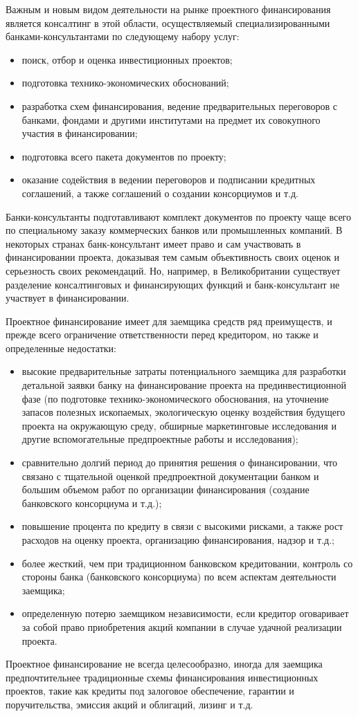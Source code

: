 Важным и новым видом деятельности на рынке проектного финансирования является консалтинг в этой области, осуществляемый специализированными банками-консультантами по следующему набору услуг:
\begin{itemize}
	\item поиск, отбор и оценка инвестиционных проектов;
	\item подготовка технико-экономических обоснований;
	\item разработка схем финансирования, ведение предварительных переговоров с банками, фондами и другими институтами на предмет их совокупного участия в финансировании;
	\item подготовка всего пакета документов по проекту;
	\item оказание содействия в ведении переговоров и подписании кредитных соглашений, а также соглашений о создании консорциумов и т.д.
\end{itemize}

Банки-консультанты подготавливают комплект документов по проекту чаще всего по специальному заказу коммерческих банков или промышленных компаний.
В некоторых странах банк-консультант имеет право и сам участвовать в финансировании проекта, доказывая тем самым объективность своих оценок и серьезность своих рекомендаций.
Но, например, в Великобритании существует разделение консалтинговых и финансирующих функций и банк-консультант не участвует в финансировании.

Проектное финансирование имеет для заемщика средств ряд преимуществ, и прежде всего ограничение ответственности перед кредитором, но также и определенные недостатки:
\begin{itemize}
	\item высокие предварительные затраты потенциального заемщика для разработки детальной заявки банку на финансирование проекта на прединвестиционной фазе (по подготовке технико-экономического обоснования, на уточнение запасов полезных ископаемых, экологическую оценку воздействия будущего проекта на окружающую среду, обширные маркетинговые исследования и другие вспомогательные предпроектные работы и исследования);
	\item сравнительно долгий период до принятия решения о финансировании, что связано с тщательной оценкой предпроектной документации банком и большим объемом работ по организации финансирования (создание банковского консорциума и т.д.);
	\item повышение процента по кредиту в связи с высокими рисками, а также рост расходов на оценку проекта, организацию финансирования, надзор и т.д.;
	\item более жесткий, чем при традиционном банковском кредитовании, контроль со стороны банка (банковского консорциума) по всем аспектам деятельности заемщика;
	\item определенную потерю заемщиком независимости, если кредитор оговаривает за собой право приобретения акций компании в случае удачной реализации проекта.
\end{itemize}

Проектное финансирование не всегда целесообразно, иногда для заемщика предпочтительнее традиционные схемы финансирования инвестиционных проектов, такие как кредиты под залоговое обеспечение, гарантии и поручительства, эмиссия акций и облигаций, лизинг и т.д.

